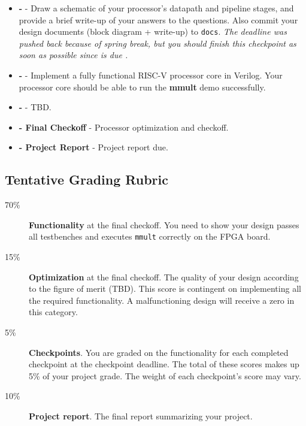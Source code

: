 \begin{minipage}{\textwidth}
\vspace{2mm}
\begin{itemize}
\item \textbf{\blockDiagramDueDate \space - \blockDiagramTaskName} -
  Draw a schematic of your processor's datapath and pipeline stages,
  and provide a brief write-up of your answers to the questions.
  Also commit your design documents (block diagram + write-up) to \verb|docs|.
  {\it The deadline was pushed back because of spring break,
  but you should finish this checkpoint as soon as possible
  since \baseCPUTaskName \space is due \baseCPUDueDate.}

\item \textbf{\baseCPUDueDate \space - \baseCPUTaskName} -
  Implement a fully functional RISC-V processor core in Verilog.
  Your processor core should be able to run the \textbf{mmult} demo successfully.

\item \textbf{\branchPredictorDueDate \space - \branchPredictorTaskName} -
  TBD.
  
\item \textbf{\finalCheckoffDueDate \space - Final Checkoff} -
  Processor optimization and checkoff.
    
\item \textbf{\finalReportDueDate \space - Project Report} -
  Project report due.
\end{itemize}
\vspace{2mm}
\end{minipage}


\clearpage
\subsection{Tentative Grading Rubric}
\begin{framed}
\begin{description}
\item[70\%] {\bf Functionality} at the final checkoff.
  You need to show your design passes all testbenches
  and executes \verb|mmult| correctly on the FPGA board.
\item[15\%] {\bf Optimization} at the final checkoff.
  The quality of your design according to the figure of merit (TBD).
  This score is contingent on implementing all the required functionality.
  A malfunctioning design will receive a zero in this category.
\item[5\%] {\bf Checkpoints}.
  You are graded on the functionality for each completed checkpoint at the checkpoint deadline.
  The total of these scores makes up 5\% of your project grade.
  The weight of each checkpoint's score may vary.
\item[10\%] {\bf Project report}.
  The final report summarizing your project.
\end{description}
\end{framed}


